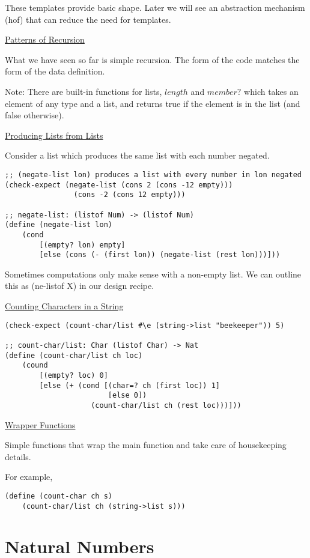 \documentclass{article}
\begin{document}
These templates provide basic shape. Later we will see an abstraction mechanism (hof) that can reduce the need for templates. 

\underline{Patterns of Recursion}

What we have seen so far is simple recursion. The form of the code matches the form of the data definition.

Note: There are built-in functions for lists, $length$ and $member?$ which takes an element of any type and a list, and returns true if the element is in the list (and false otherwise). 

\underline{Producing Lists from Lists}

Consider a list which produces the same list with each number negated. 

\begin{lstlisting}
;; (negate-list lon) produces a list with every number in lon negated
(check-expect (negate-list (cons 2 (cons -12 empty)))
                (cons -2 (cons 12 empty)))

;; negate-list: (listof Num) -> (listof Num)
(define (negate-list lon)
    (cond
        [(empty? lon) empty]
        [else (cons (- (first lon)) (negate-list (rest lon)))]))
\end{lstlisting}

Sometimes computations only make sense with a non-empty list. We can outline this as (ne-listof X) in our design recipe. 


\underline{Counting Characters in a String}

\begin{lstlisting}
(check-expect (count-char/list #\e (string->list "beekeeper")) 5)

;; count-char/list: Char (listof Char) -> Nat
(define (count-char/list ch loc)
    (cound
        [(empty? loc) 0]
        [else (+ (cond [(char=? ch (first loc)) 1]
                        [else 0])
                    (count-char/list ch (rest loc)))]))
\end{lstlisting}


\underline{Wrapper Functions}

Simple functions that wrap the main function and take care of housekeeping details. 

For example,
\begin{lstlisting}
(define (count-char ch s)
    (count-char/list ch (string->list s)))
\end{lstlisting}


\section{Natural Numbers}
\end{document}
